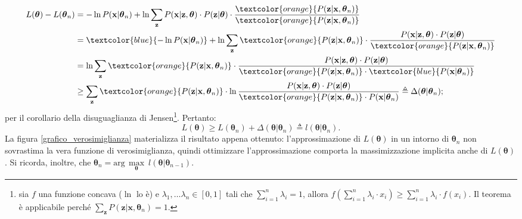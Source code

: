 \begin{equation}
	\begin{split}
		L(\boldsymbol{\theta}) - L(\boldsymbol{\theta}_n) & = -\ln P(\mathbf{x}|\boldsymbol{\theta}_n) + \ln\sum_{\mathbf{z}}^{} P(\mathbf{x}|\mathbf{z},\boldsymbol{\theta})\cdot P(\mathbf{z}|\boldsymbol{\theta})\cdot\frac{\textcolor{orange}{P(\mathbf{z}|\mathbf{x},\boldsymbol{\theta}_n)}}{\textcolor{orange}{P(\mathbf{z}|\mathbf{x},\boldsymbol{\theta}_n)}} \\
		& = \textcolor{blue}{-\ln P(\mathbf{x}|\boldsymbol{\theta}_n)} + \ln\sum_{\mathbf{z}}^{} \textcolor{orange}{P(\mathbf{z}|\mathbf{x},\boldsymbol{\theta}_n)}\cdot\frac{P(\mathbf{x}|\mathbf{z},\boldsymbol{\theta})\cdot P(\mathbf{z}|\boldsymbol{\theta})}{\textcolor{orange}{P(\mathbf{z}|\mathbf{x},\boldsymbol{\theta}_n)}} \\
		& = \ln\sum_{\mathbf{z}}^{} \textcolor{orange}{P(\mathbf{z}|\mathbf{x},\boldsymbol{\theta}_n)}\cdot\frac{P(\mathbf{x}|\mathbf{z},\boldsymbol{\theta})\cdot P(\mathbf{z}|\boldsymbol{\theta})}{\textcolor{orange}{P(\mathbf{z}|\mathbf{x},\boldsymbol{\theta}_n)}\cdot\textcolor{blue}{ P(\mathbf{x}|\boldsymbol{\theta}_n)}} \\
		& \geq\sum_{\mathbf{z}}^{}\textcolor{orange}{P(\mathbf{z}|\mathbf{x},\boldsymbol{\theta}_n)}\cdot\ln\frac{P(\mathbf{x}|\mathbf{z},\boldsymbol{\theta})\cdot P(\mathbf{z}|\boldsymbol{\theta})}{\textcolor{orange}{P(\mathbf{z}|\mathbf{x},\boldsymbol{\theta}_n)}\cdot P(\mathbf{x}|\boldsymbol{\theta}_n)} \triangleq\Delta(\boldsymbol{\theta}|\boldsymbol{\theta}_n);
	\end{split}
\end{equation}
per il corollario della disuguaglianza di Jensen\footnote{sia $f$ una funzione concava ($\ln$ lo è) e $\lambda_1,\dots\lambda_n\in [0,1]$ tali che $\sum_{i=1}^{n}\lambda_i = 1$, allora $f(\sum_{i=1}^{n}\lambda_i\cdot x_i)\geq\sum_{i=1}^{n}\lambda_i\cdot f(x_i)$. Il teorema è applicabile perché $\sum_{\mathbf{z}}^{} P(\mathbf{z}|\mathbf{x},\boldsymbol{\theta}_n)=1$.}. Pertanto:
\begin{equation}
	L(\boldsymbol{\theta})\geq L(\boldsymbol{\theta}_n)+\Delta(\boldsymbol{\theta}|\boldsymbol{\theta}_n)\triangleq l(\boldsymbol{\theta}|\boldsymbol{\theta}_n).
\end{equation}
La figura \ref{grafico_verosimiglianza} materializza il risultato appena ottenuto: l'approssimazione di $L(\boldsymbol{\theta})$ in un intorno di $\boldsymbol{\theta}_n$ non sovrastima la vera funzione di verosimiglianza, quindi ottimizzare l'approssimazione comporta la massimizzazione implicita anche di $L(\boldsymbol{\theta})$. Si ricorda, inoltre, che $\boldsymbol{\theta}_n = \text{arg}\,\max\limits_{\boldsymbol{\theta}} \ l(\boldsymbol{\theta}|\boldsymbol{\theta}_{n-1})$.

